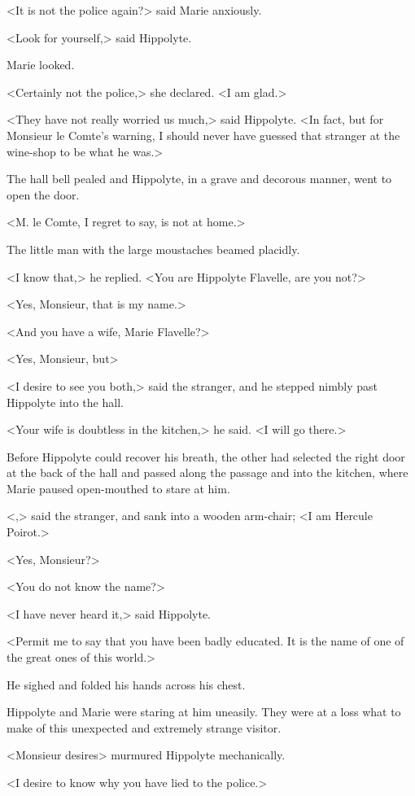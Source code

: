 <It is not the police again?> said Marie anxiously.

<Look for yourself,> said Hippolyte.

Marie looked.

<Certainly not the police,> she declared. <I am glad.>

<They have not really worried us much,> said Hippolyte. <In fact, but for Monsieur le Comte's warning, I should never have guessed that stranger at the wine-shop to be what he was.>

The hall bell pealed and Hippolyte, in a grave and decorous manner, went to open the door.

<M. le Comte, I regret to say, is not at home.>

The little man with the large moustaches beamed placidly.

<I know that,> he replied. <You are Hippolyte Flavelle, are you not?>

<Yes, Monsieur, that is my name.>

<And you have a wife, Marie Flavelle?>

<Yes, Monsieur, but\longdash>

<I desire to see you both,> said the stranger, and he stepped nimbly past Hippolyte into the hall.

<Your wife is doubtless in the kitchen,> he said. <I will go there.>

Before Hippolyte could recover his breath, the other had selected the right door at the back of the hall and passed along the passage and into the kitchen, where Marie paused open-mouthed to stare at him.

<,> said the stranger, and sank into a wooden arm-chair; <I am Hercule Poirot.>

<Yes, Monsieur?>

<You do not know the name?>

<I have never heard it,> said Hippolyte.

<Permit me to say that you have been badly educated. It is the name of one of the great ones of this world.>

He sighed and folded his hands across his chest.

Hippolyte and Marie were staring at him uneasily. They were at a loss what to make of this unexpected and extremely strange visitor.

<Monsieur desires\longdash> murmured Hippolyte mechanically.

<I desire to know why you have lied to the police.>

